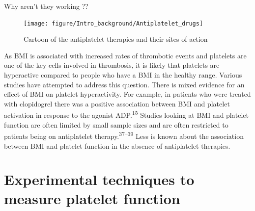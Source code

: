 \documentclass[11pt,twoside]{bristolthesis}
\begin{document}
Why aren't they working ??
\begin{figure}
\texttt{[image: figure/Intro\_background/Antiplatelet\_drugs]} \caption[Antiplatelet drugs]{Cartoon of the antiplatelet therapies and their sites of action}\label{fig:antiplatelet-drugs}
\end{figure}
As BMI is associated with increased rates of thrombotic events and platelets are one of the key cells involved in thrombosis, it is likely that platelets are hyperactive compared to people who have a BMI in the healthy range. Various studies have attempted to address this question. There is mixed evidence for an effect of BMI on platelet hyperactivity. For example, in patients who were treated with clopidogrel there was a positive association between BMI and platelet activation in response to the agonist ADP.\textsuperscript{15} Studies looking at BMI and platelet function are often limited by small sample sizes and are often restricted to patients being on antiplatelet therapy.\textsuperscript{37--39} Less is known about the association between BMI and platelet function in the absence of antiplatelet therapies.

\hypertarget{experimental-techniques-to-measure-platelet-function}{%
\section{Experimental techniques to measure platelet function}\label{experimental-techniques-to-measure-platelet-function}}
\end{document}
